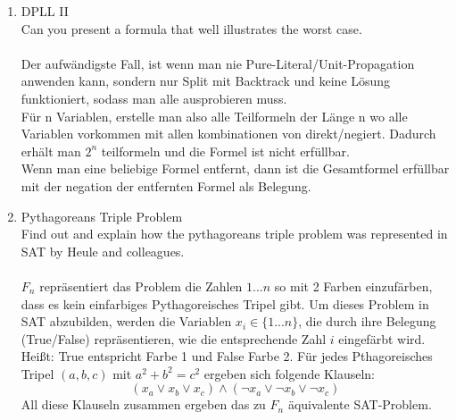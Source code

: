 \documentclass[a4paper,twoside,12pt]{article}
\newcounter{AUFGNR}
\newcommand{\AUFGABE}[1]{\vspace{0.3cm}\item[Exercise~{\arabic{AUFGNR}}:]\stepcounter{AUFGNR} #1\\[1ex]}
\begin{document}
\begin{enumerate}[wide=-0.2cm]
	\AUFGABE{DPLL II}
	Can you present a formula that well illustrates the worst case.\\
	\\
	Der aufwändigste Fall, ist wenn man nie Pure-Literal/Unit-Propagation anwenden kann, sondern nur Split mit Backtrack und keine Lösung funktioniert, sodass man alle ausprobieren muss.\\
	Für n Variablen, erstelle man also alle Teilformeln der Länge n wo alle Variablen vorkommen mit allen kombinationen von direkt/negiert. Dadurch erhält man $2^n$ teilformeln und die Formel ist nicht erfüllbar.\\
	Wenn man eine beliebige Formel entfernt, dann ist die Gesamtformel erfüllbar mit der negation der entfernten Formel als Belegung.
	\AUFGABE{Pythagoreans Triple Problem}
	Find out and explain how the pythagoreans triple problem was represented in SAT by Heule and colleagues.\\
	\\
	\(F_n\) repräsentiert das Problem die Zahlen \(1...n\) so mit 2 Farben einzufärben, dass es kein einfarbiges Pythagoreisches Tripel gibt. Um dieses Problem in SAT abzubilden, werden die Variablen \(x_i \in  \{1...n\}\), die durch ihre Belegung (True/False) repräsentieren, wie die entsprechende Zahl \(i\) eingefärbt wird. Heißt: True entspricht Farbe 1 und False Farbe 2.  Für jedes Pthagoreisches Tripel \((a,b,c)\) mit \(a^2 + b^2  = c^2\) ergeben sich folgende Klauseln: 
	\[(x_a \vee x_b \vee x_c) \wedge (\neg  x_a \vee \neg x_b \vee \neg x_c)\] All diese Klauseln zusammen ergeben das zu \(F_n\) äquivalente SAT-Problem.
	
\end{enumerate}
\end{document}
